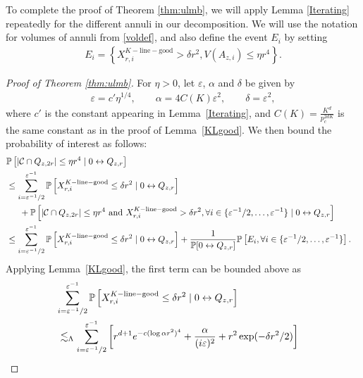 \documentclass[11pt]{article}
\theoremstyle{definition}
\theoremstyle{remark}
\newcommand{\bP}{\mathbb{P}}
\numberwithin{equation}{section}
\theoremstyle{plain}
\theoremstyle{definition}
\theoremstyle{remark}
\theoremstyle{plain}
\begin{document}
To complete the proof of Theorem \ref{thm:ulmb}, we will apply Lemma \ref{Iterating} repeatedly for the different annuli in our decomposition. We will use the notation for volumes of annuli from \eqref{voldef}, and also define the event $E_i$ by setting
\begin{align*}
E_i=\left\{X_{r,i}^{K-\mathrm{line-good}}>\delta r^2, V(A_{z,i})\le \eta r^4\right\}.
\end{align*}

\begin{proof}[Proof of Theorem \ref{thm:ulmb}] For $\eta>0$, let $\varepsilon$, $\alpha$ and $\delta$ be given by
\begin{align}\label{conditions}
\varepsilon=c'\eta^{1/4},\qquad\alpha=4C(K)\varepsilon^2,\qquad\delta=\varepsilon^2,
\end{align}
where $c'$ is the constant appearing in Lemma~\ref{Iterating}, and $C(K)=\frac{K^d}{p_c^{2dK}}$ is the same constant as in the proof of Lemma~\ref{KLgood}. We then bound the probability of interest as follows:
\begin{align}
\lefteqn{\bP\left[|\mathcal C\cap Q_{z,2r}|\le \eta r^4\mid0 \leftrightarrow Q_{z,r}\right]}\nonumber\\
&\le \sum_{i=\varepsilon^{-1}/2}^{\varepsilon^{-1}}\bP\left[X_{r,i}^{K-\mathrm{line-good}}\le \delta r^2\mid0 \leftrightarrow Q_{z,r}\right]\nonumber\\
&\hspace{15pt}+\bP\left[|\mathcal C\cap Q_{z,2r}|\le \eta r^4\mbox{ and }X_{r,i}^{K-\mathrm{line-good}}> \delta r^2, \forall i\in \{\varepsilon^{-1}/2,\dots,\varepsilon^{-1}\}\mid0\leftrightarrow Q_{z,r}\right]\nonumber\\
&\le  \sum_{i=\varepsilon^{-1}/2}^{\varepsilon^{-1}}\bP\left[X_{r,i}^{K-\mathrm{line-good}}\le \delta r^2\mid0 \leftrightarrow Q_{z,r}\right]+\frac{1}{\bP[0 \leftrightarrow Q_{z,r}]}\bP\left[E_i,\forall i\in \{\varepsilon^{-1}/2,\dots,\varepsilon^{-1}\}\right]. \label{mass}
\end{align}
Applying Lemma~\ref{KLgood}, the first term can be bounded above as
\begin{align*}
\lefteqn{\sum_{i=\varepsilon^{-1}/2}^{\varepsilon^{-1}}\bP\left[X_{r,i}^{K-\mathrm{line-good}}\le \delta r^2\mid0 \leftrightarrow Q_{z,r}\right]}\\
  &\lesssim_{\Lambda} \sum_{i=\varepsilon^{-1}/2}^{\varepsilon^{-1}}\left[r^{d+1}e^{-c(\log \alpha r^2)^4}+\frac{\alpha}{(i\varepsilon)^2}+ r^2\exp(-\delta r^2/2)\right]\\

\end{align*}
\end{proof}
\end{document}
